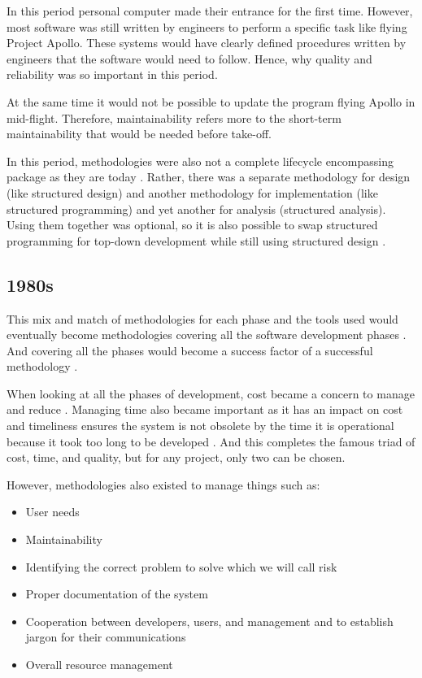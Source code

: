 In this period personal computer made their entrance for the first time.
However, most software was still written by engineers to perform a specific task like flying Project Apollo.
These systems would have clearly defined procedures written by engineers that the software would need to follow.
Hence, why quality and reliability was so important in this period.

At the same time it would not be possible to update the program flying Apollo in mid-flight.
Therefore, maintainability refers more to the short-term maintainability that would be needed before take-off.

In this period, methodologies were also not a complete lifecycle encompassing package as they are today \cite{soi_1982, beregi_1985}.
Rather, there was a separate methodology for design (like structured design) and another methodology for implementation (like structured programming) and yet another for analysis (structured analysis).
Using them together was optional, so it is also possible to swap structured programming for top-down development while still using structured design \cite{yourdon_1977}.

\subsection{1980s}
This mix and match of methodologies for each phase and the tools used would eventually become methodologies covering all the software development phases \cite{beregi_1985}.
And covering all the phases would become a success factor of a successful methodology \cite{soi_1982}.

When looking at all the phases of development, cost became a concern to manage and reduce \cite{vanderlei_1983, peacham_1985, loesh_1985}.
Managing time also became important as it has an impact on cost and timeliness ensures the system is not obsolete by the time it is operational because it took too long to be developed \cite{peacham_1985, beregi_1985, mannino_1987, paul_1993}.
And this completes the famous triad of cost, time, and quality, but for any project, only two can be chosen.

However, methodologies also existed to manage things such as:
\begin{itemize}
    \item User needs \cite{peacham_1985}
    \item Maintainability \cite{peacham_1985}
    \item Identifying the correct problem to solve which we will call risk \cite{peacham_1985}
    \item Proper documentation of the system \cite{loesh_1985}
    \item Cooperation between developers, users, and management and to establish jargon for their communications \cite{loesh_1985}
    \item Overall resource management \cite{mannino_1987}
\end{itemize}

